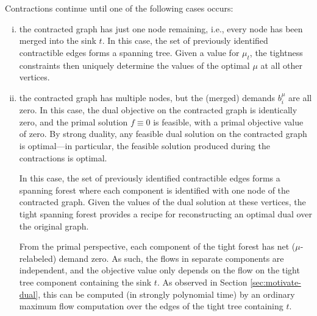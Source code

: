 \documentclass[11pt]{article}
\theoremstyle{definition}
\theoremstyle{definition}
\theoremstyle{definition}
\newcommand{\biu}{b_{i}^{\mu}}
\begin{document}
	Contractions continue until one of the following cases occurs:
	\begin{enumerate}[(i),itemsep=0mm]
	\item the contracted graph has just one node remaining, i.e., every node has been merged
	into the sink $t$. In this case, the set of previously identified
	contractible edges forms a spanning tree. Given a value for $\mu_t$, the tightness
	constraints then uniquely determine the values of the optimal $\mu$ at all other vertices.
	
	\item the contracted graph has multiple nodes, but the (merged)
	demands $\biu$ are all zero. In this case, the dual objective on the contracted
	graph is identically zero, and the primal solution $f \equiv 0$ is feasible,
	with a primal objective value of zero. By strong duality, any feasible dual
	solution on the contracted graph is optimal---in particular, the feasible
	solution produced during the contractions is optimal.
	
	In this case, the set of previously identified contractible edges
	forms a spanning forest where each component is identified with one node
	of the contracted graph. Given the values of the dual solution at these vertices,
	the tight spanning forest provides a recipe for reconstructing
	an optimal dual over the original graph.
	
	From the primal perspective, each component of the tight forest has net ($\mu$-relabeled)
	demand zero. As such, the flows in separate components are independent, and the objective
	value only depends on the flow on the tight tree component containing the sink $t$.
	As observed in Section \ref{sec:motivate-dual}, this
	can be computed (in strongly polynomial time)
	by an ordinary maximum flow computation over the edges of the tight tree containing $t$.
	\end{enumerate}
    
\end{document}
